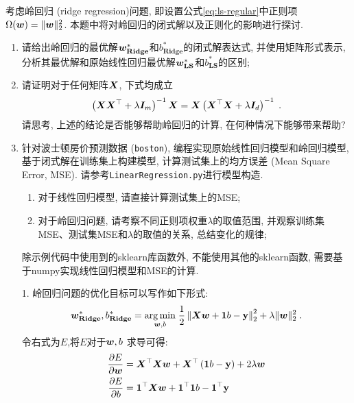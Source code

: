 \documentclass[answers]{exam}  %
\begin{document}
\begin{questions}
	考虑岭回归 (ridge regression)问题, 即设置公式\eqref{eq:ls-regular}中正则项$\Omega(\boldsymbol{w}) = \lVert \boldsymbol{w}\rVert_2^2$. 本题中将对岭回归的闭式解以及正则化的影响进行探讨.
	\begin{enumerate}
		\item 请给出岭回归的最优解$\boldsymbol{w}_{\mathbf{Ridge}}^*$和$b_{\mathbf{Ridge}}^*$的闭式解表达式, 并使用矩阵形式表示, 分析其最优解和原始线性回归最优解$\boldsymbol{w}_{\mathbf{LS}}^*$和$b_{\mathbf{LS}}^*$的区别;
		\item 请证明对于任何矩阵$\boldsymbol{X}$, 下式均成立
		      \begin{align}
			      \left(\boldsymbol{X} \boldsymbol{X}^{\top}+\lambda \boldsymbol{I}_m\right)^{-1} \boldsymbol{X}=\boldsymbol{X}\left(\boldsymbol{X}^{\top} \boldsymbol{X}+\lambda \boldsymbol{I}_d\right)^{-1}\;.
		      \end{align}
		      请思考, 上述的结论是否能够帮助岭回归的计算, 在何种情况下能够带来帮助?
		\item 针对波士顿房价预测数据 (\lstinline{boston}), 编程实现原始线性回归模型和岭回归模型, 基于闭式解在训练集上构建模型, 计算测试集上的均方误差 (Mean Square Error, MSE). 请参考\lstinline{LinearRegression.py}进行模型构造.
		      
		      \begin{enumerate}
			      \item 对于线性回归模型, 请直接计算测试集上的MSE;
			      \item 对于岭回归问题, 请考察不同正则项权重$\lambda$的取值范围, 并观察训练集MSE、测试集MSE和$\lambda$的取值的关系, 总结变化的规律;
		      \end{enumerate} 除示例代码中使用到的sklearn库函数外, 不能使用其他的sklearn函数, 需要基于numpy实现线性回归模型和MSE的计算.
	\end{enumerate}
	\begin{solution}
		\begin{enumerate}
			\item[1.]岭回归问题的优化目标可以写作如下形式:
			      \begin{equation*}
				      \boldsymbol{w}_{\mathbf{Ridge}}^{*}, b_{\mathbf{Ridge}}^{*}=\underset{\boldsymbol{w}, b}{\arg \min }\; \frac{1}{2}\left\|\boldsymbol{X} \boldsymbol{w}+\boldsymbol{1} b-\mathbf{y}\right\|_{2}^{2}+\lambda \| \boldsymbol{w} \|_2^2 \; .
			      \end{equation*}
			      令右式为$E$,将$E$对于$\boldsymbol{w},b$ 求导可得:
			      \begin{align}
				      \frac{\partial E}{\partial \vw} & =\mX^\top\mX\vw+\mX^\top\left(\ones b-\mathbf{y}\right)+2\lambda \vw\label{part:vw} \\
				      \frac{\partial E}{\partial b}   & =\ones^\top\mX\vw+\ones^\top\ones b-\ones^\top\mathbf{y}\label{part:b}

\end{align}
\end{enumerate}
\end{solution}
\end{questions}
\end{document}
